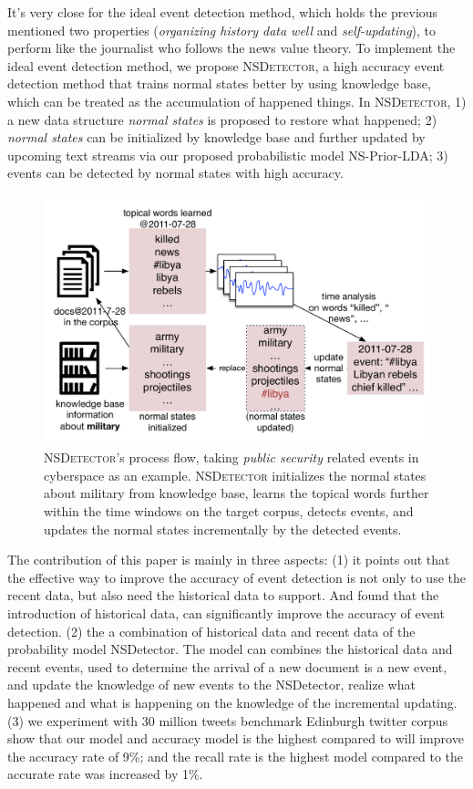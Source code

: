 \documentclass[conference,compsoc]{IEEEtran}
\begin{document}
It's very close for the ideal event detection method, which holds the previous mentioned two properties (\textit{organizing history data well} and \textit{self-updating}), to perform like the journalist who follows the news value theory. To implement the ideal event detection method, we propose \textsc{NSDetector}, a high accuracy event detection method that trains normal states better by using knowledge base, which can be treated as the accumulation of happened things. 
In \textsc{NSDetector}, 1) a new data structure \textit{normal states} is proposed to restore what happened; 2) \textit{normal states} can be initialized by knowledge base and further updated by upcoming text streams via our proposed probabilistic model NS-Prior-LDA; 3) events can be detected by normal states with high accuracy.



\begin{figure}
    \label{fig:modelDesc}
    \includegraphics[width=1.0\columnwidth]{img/NSDetectorExample.pdf}
    \caption{\textsc{NSDetector}'s process flow, taking \textit{public security} related events in cyberspace as an example. \textsc{NSDetector} initializes the normal states about military from knowledge base, learns the topical words further within the time windows on the target corpus, detects events, and updates the normal states incrementally by the detected events.}
\end{figure}

The contribution of this paper is mainly in three aspects:
(1) it points out that the effective way to improve the accuracy of event detection is not only to use the recent data, but also need the historical data to support. And found that the introduction of historical data, can significantly improve the accuracy of event detection.
(2) the a combination of historical data and recent data of the probability model NSDetector. The model can combines the historical data and recent events, used to determine the arrival of a new document is a new event, and update the knowledge of new events to the NSDetector, realize what happened and what is happening on the knowledge of the incremental updating.
(3) we experiment with 30 million tweets benchmark Edinburgh twitter corpus show that our model and accuracy model is the highest compared to will improve the accuracy rate of 9\%; and the recall rate is the highest model compared to the accurate rate was increased by 1\%.
\end{document}
